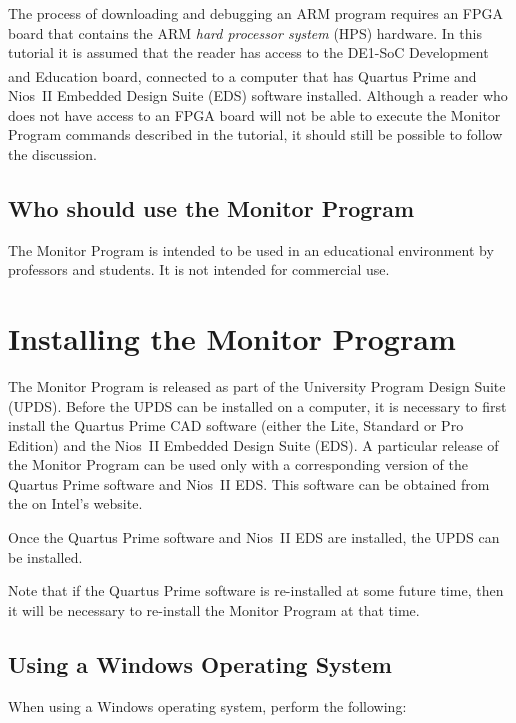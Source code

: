 \documentclass[11pt, twoside, pdftex]{article}
\begin{document}
The process of downloading and debugging an ARM program requires
an FPGA board that contains the ARM 
{\it hard processor system} (HPS) hardware. In this
tutorial it is assumed that the reader has access to the DE1-SoC Development and Education board, connected to a computer
that has Quartus\textsuperscript{\textregistered} Prime 
and Nios~II Embedded Design Suite (EDS) software installed. Although a reader who does not have access to an FPGA
board will not be able to execute the Monitor Program commands described in the tutorial, 
it should still be possible to follow the discussion.


\subsection{Who should use the Monitor Program}
\label{sec:1.1}

The Monitor Program is intended to be used in an educational environment by professors and students. It is not intended for
commercial use.

\section{Installing the Monitor Program}
\label{sec:2}

The Monitor Program is released as part of the University Program 
Design Suite (UPDS). Before the UPDS can be installed on
a computer, it is necessary to first install the Quartus Prime
CAD software (either the Lite, Standard or Pro Edition) 
and the Nios~II Embedded Design Suite (EDS). A particular release
of the Monitor Program can be used only with a corresponding version of the Quartus Prime software and Nios~II EDS. This software
can be obtained from the on Intel's website.

Once the Quartus Prime software and Nios~II EDS are installed, the UPDS can be installed.

Note that if the Quartus Prime software is re-installed at some
future time, then it will be necessary to re-install the Monitor
Program at that time.

\subsection{Using a Windows Operating System}
\label{sec:2.1}

When using a Windows operating system, perform the following: 
\end{document}
